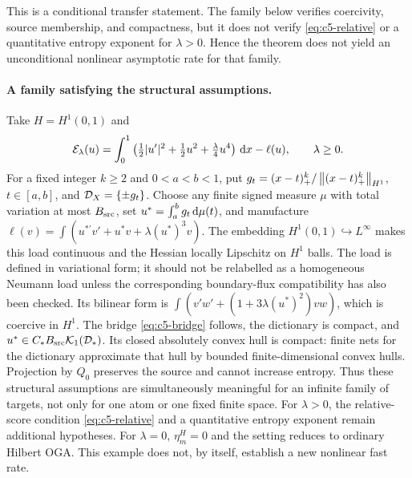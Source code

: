 \documentclass[11pt]{article}
\theoremstyle{remark}
\begin{document}
This is a conditional transfer statement. The family below verifies
coercivity, source membership, and compactness, but it does not verify
\eqref{eq:c5-relative} or a quantitative entropy exponent for
\(\lambda>0\). Hence the theorem does not yield an unconditional nonlinear
asymptotic rate for that family.

\paragraph{A family satisfying the structural assumptions.}
Take $H=H^1(0,1)$ and
\[
 \mathcal E_\lambda(u)=\int_0^1
 \left(\tfrac12|u'|^2+\tfrac12u^2+\tfrac\lambda4u^4\right)\,\mathrm d x-\ell(u),
 \qquad\lambda\geq0 .
\]
For a fixed integer $k\geq2$ and $0<a<b<1$, put
$g_t=(x-t)_+^k/\left\lVert(x-t)_+^k\right\rVert_{H^1}$, $t\in[a,b]$,
and $\mathcal D_X=\{\pm g_t\}$.
Choose any finite signed measure $\mu$ with total variation at most
$B_{\rm src}$, set $u^*=\int_a^b g_t\,\mathrm d\mu(t)$, and manufacture
$\ell(v)=\int(u^{*\prime}v'+u^*v+\lambda(u^*)^3v)$.
The embedding $H^1(0,1)\hookrightarrow L^\infty$ makes this load
continuous and the Hessian locally Lipschitz on $H^1$ balls.  The load is
defined in variational form; it should not be relabelled as a homogeneous
Neumann load unless the corresponding boundary-flux compatibility has also
been checked.
Its bilinear form is
$\int(v'w'+(1+3\lambda(u^*)^2)vw)$, which is coercive in $H^1$.
The bridge \eqref{eq:c5-bridge} follows, the dictionary is compact,
and $u^*\in C_*B_{\rm src}\mathcal K_1(\mathcal D_*)$.
Its closed absolutely convex hull is compact: finite nets for the
dictionary approximate that hull by bounded finite-dimensional convex hulls.
Projection by $Q_0$ preserves the source and cannot increase entropy.
Thus these structural assumptions are simultaneously meaningful for an
infinite family of targets, not only for one atom or one fixed finite space.
For $\lambda>0$, the relative-score condition
\eqref{eq:c5-relative} and a quantitative entropy exponent remain additional
hypotheses. For $\lambda=0$, $\eta_m^H=0$ and the setting reduces to
ordinary Hilbert OGA. This example does not, by itself, establish a new
nonlinear fast rate.
\end{document}
